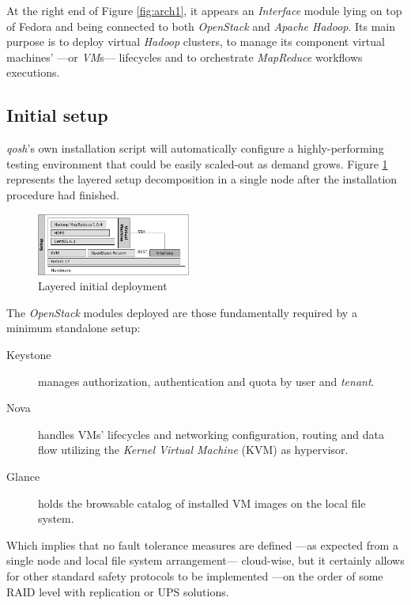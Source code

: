 \documentclass{sig-alternate}
\begin{document}
At the right end of Figure \ref{fig:arch1}, it appears an \emph{Interface} module lying on top of Fedora and being connected to both \emph{OpenStack} and \emph{Apache Hadoop}. Its main purpose is to deploy virtual \emph{Hadoop} clusters, to manage its component virtual machines' ---or \emph{VM}s--- lifecycles and to orchestrate \emph{MapReduce} workflows executions.



\subsection{Initial setup}
\noindent \emph{qosh}'s own installation script will automatically configure a highly-performing testing environment that could be easily scaled-out as demand grows. Figure \ref{fig:initial} represents the layered setup decomposition in a single node after the installation procedure had finished.

\begin{figure}[tbp]
\centering
\includegraphics[width=0.45\textwidth]{img/005}
\caption{Layered initial deployment}
\label{fig:initial}
\end{figure}

The \emph{OpenStack} modules deployed are those fundamentally required by a minimum standalone setup:

\begin{description}
 \item[Keystone] manages authorization, authentication and quota by user and \emph{tenant}.
 \item[Nova] handles VMs' lifecycles and networking configuration, routing and data flow utilizing the \emph{Kernel Virtual Machine} (KVM) as hypervisor.
 \item[Glance] holds the browsable catalog of installed VM images on the local file system.
\end{description}

Which implies that no fault tolerance measures are defined ---as expected from a single node and local file system arrangement--- cloud-wise, but it certainly allows for other standard safety protocols to be implemented ---on the order of some RAID level with replication or UPS solutions.
\end{document}
